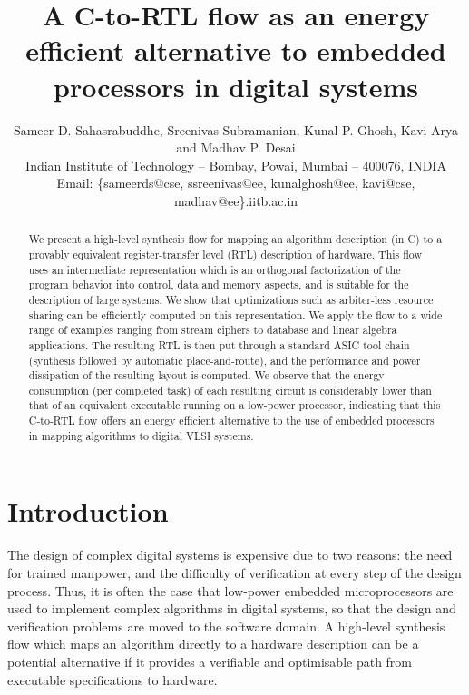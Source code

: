 \documentclass[conference]{IEEEtran}
\title{A C-to-RTL flow as an energy efficient alternative to embedded
  processors in digital systems}
\author{Sameer D. Sahasrabuddhe, Sreenivas
  Subramanian, Kunal P. Ghosh, Kavi Arya and Madhav P. Desai\\
  Indian Institute of Technology -- Bombay, Powai, Mumbai -- 400076, INDIA\\
  Email: \{sameerds@cse, ssreenivas@ee, kunalghosh@ee, kavi@cse,
  madhav@ee\}.iitb.ac.in }
\begin{document}
\maketitle
\thispagestyle{empty}

\begin{abstract}

  We present a high-level synthesis flow for mapping an algorithm
  description (in C) to a provably equivalent register-transfer level
  (RTL) description of hardware. This flow uses an intermediate
  representation which is an orthogonal factorization of the program
  behavior into control, data and memory aspects, and is suitable for
  the description of large systems. We show that optimizations such as
  arbiter-less resource sharing can be efficiently computed on this
  representation. We apply the flow to a wide range of examples
  ranging from stream ciphers to database and linear algebra
  applications. The resulting RTL is then put through a standard ASIC
  tool chain (synthesis followed by automatic place-and-route), and
  the performance and power dissipation of the resulting layout is
  computed. We observe that the energy consumption (per completed
  task) of each resulting circuit is considerably lower than that of
  an equivalent executable running on a low-power processor,
  indicating that this C-to-RTL flow offers an energy efficient
  alternative to the use of embedded processors in mapping algorithms
  to digital VLSI systems.

\end{abstract}

\section{Introduction}


The design of complex digital systems is expensive due to two reasons:
the need for trained manpower, and the difficulty of verification at
every step of the design process. Thus, it is often the case that
low-power embedded microprocessors are used to implement complex
algorithms in digital systems, so that the design and verification
problems are moved to the software domain. A high-level synthesis flow
which maps an algorithm directly to a hardware description can be a
potential alternative if it provides a verifiable and optimisable path
from executable specifications\cite{gajski-executable-specification}
to hardware.   
\end{document}
